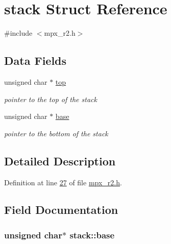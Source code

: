 \hypertarget{structstack}{
\section{stack Struct Reference}
\label{structstack}
}


{\ttfamily \#include $<$mpx\_\-r2.h$>$}

\subsection*{Data Fields}
\begin{DoxyCompactItemize}
\item 
unsigned char $\ast$ \hyperlink{structstack_adf145fa22a24464ff19409e2618a583d}{top}
\begin{DoxyCompactList}\small\item\em pointer to the top of the stack \item\end{DoxyCompactList}\item 
unsigned char $\ast$ \hyperlink{structstack_a1cdb71e486a79747d482aa46f6b10290}{base}
\begin{DoxyCompactList}\small\item\em pointer to the bottom of the stack \item\end{DoxyCompactList}\end{DoxyCompactItemize}


\subsection{Detailed Description}


Definition at line \hyperlink{mpx__r2_8h_source_l00027}{27} of file \hyperlink{mpx__r2_8h_source}{mpx\_\-r2.h}.



\subsection{Field Documentation}
\hypertarget{structstack_a1cdb71e486a79747d482aa46f6b10290}{
\subsubsection[{base}]{\setlength{\rightskip}{0pt plus 5cm}unsigned char$\ast$ {\bf stack::base}}}
\label{structstack_a1cdb71e486a79747d482aa46f6b10290}



